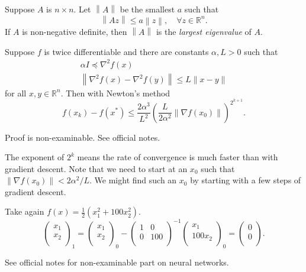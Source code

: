 \begin{definition}
    Suppose $A$ is $n\times n$. Let $ \left\| A \right\| $ be the smallest $a$ such that 
    \[
        \left\| A z \right\| \le a \left\| z \right\|,\quad \forall z\in \mathbb{R}^{n}.
    \]
    If $A$ is non-negative definite, then $\left\| A \right\|$ is the \textit{largest eigenvalue} of $A$. 
\end{definition}

\begin{theorem}
    Suppose $f$ is twice differentiable and there are constants $\alpha, L>0$ such that
\[
\begin{gathered}
\alpha I \preceq \nabla^2 f(x) \\
\left\|\nabla^2 f(x)-\nabla^2 f(y)\right\| \leq L\|x-y\|
\end{gathered}
\]
for all $x, y \in \mathbb{R}^n$. Then with Newton's method
\[
f\left(x_k\right)-f\left(x^*\right) \leq \frac{2 \alpha^3}{L^2}\left(\frac{L}{2 \alpha^2}\left\|\nabla f\left(x_0\right)\right\|\right)^{2^{k+1}}.
\]
\end{theorem}

Proof is non-examinable. See official notes. 

\begin{note}
    The exponent of $2^k$ means the rate of convergence is much faster than with gradient descent. Note that we need to start at an $x_0$ such that $\left\|\nabla f\left(x_0\right)\right\|<2 \alpha^2 / L$. We might find such an $x_0$ by starting with a few steps of gradient descent.
\end{note}

\begin{example}
    Take again $ f(x) = \frac{1}{2}(x_1^2+100x_2^2) $. 
    \[
        \begin{pmatrix}
             x_1 \\
             x_2 \\
        \end{pmatrix}_1 = \begin{pmatrix}
             x_1 \\
             x_2 \\
        \end{pmatrix}_0 - \begin{pmatrix}
            1 &  0 \\
            0 &  100 \\
        \end{pmatrix}^{-1} \begin{pmatrix}
             x_1 \\
             100x_2 \\
        \end{pmatrix}_0 = \begin{pmatrix}
             0 \\
             0 \\
        \end{pmatrix}.
    \]
\end{example}
See official notes for non-examinable part on neural networks. 